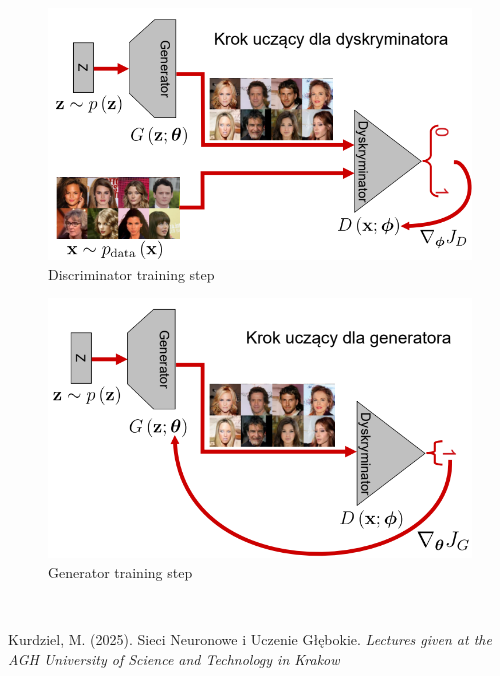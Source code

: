 \documentclass[a5paper]{article}
\begin{document}
\begin{figure}[ht]
   \centering
   \includegraphics[width=0.65\columnwidth]{figs/gan_train_1.png}
   \caption{Discriminator training step \cite{Kurdziel}}
   \label{fig:gan_train_1}
\end{figure}

\begin{figure}[ht]
   \centering
   \includegraphics[width=0.65\columnwidth]{figs/gan_train_2.png}
   \caption{Generator training step \cite{Kurdziel}}
   \label{fig:gan_train_2}
\end{figure}

~

\begin{thebibliography}{9}
    Kurdziel, M. (2025). Sieci Neuronowe i Uczenie Głębokie. \textit{Lectures
   given at the AGH University of Science and Technology in Krakow}
\end{thebibliography}
\end{document}
